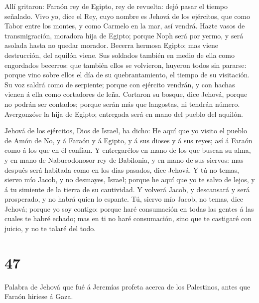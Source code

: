  Allí gritaron: Faraón rey de Egipto, rey de revuelta: dejó
pasar el tiempo señalado.  Vivo yo, dice el Rey, cuyo
nombre es Jehová de los ejércitos, que como Tabor entre los montes, y
como Carmelo en la mar, así vendrá.  Hazte vasos de
transmigración, moradora hija de Egipto; porque Noph será por yermo, y
será asolada hasta no quedar morador.  Becerra hermosa
Egipto; mas viene destrucción, del aquilón viene.  Sus
soldados también en medio de ella como engordados becerros: que también
ellos se volvieron, huyeron todos sin pararse: porque vino sobre ellos
el día de su quebrantamiento, el tiempo de su visitación. 
Su voz saldrá como de serpiente; porque con ejército vendrán, y con
hachas vienen á ella como cortadores de leña.  Cortaron su
bosque, dice Jehová, porque no podrán ser contados; porque serán más que
langostas, ni tendrán número.  Avergonzóse la hija de
Egipto; entregada será en mano del pueblo del aquilón.

 Jehová de los ejércitos, Dios de Israel, ha dicho: He aquí
que yo visito el pueblo de Amón de No, y á Faraón y á Egipto, y á sus
dioses y á sus reyes; así á Faraón como á los que en él confían.
 Y entregarélos en mano de los que buscan su alma, y en
mano de Nabucodonosor rey de Babilonia, y en mano de sus siervos: mas
después será habitada como en los días pasados, dice Jehová.
 Y tú no temas, siervo mío Jacob, y no desmayes, Israel;
porque he aquí que yo te salvo de lejos, y á tu simiente de la tierra de
su cautividad. Y volverá Jacob, y descansará y será prosperado, y no
habrá quien lo espante.  Tú, siervo mío Jacob, no temas,
dice Jehová; porque yo soy contigo: porque haré consumación en todas las
gentes á las cuales te habré echado; mas en ti no haré consumación, sino
que te castigaré con juicio, y no te talaré del todo.

\hypertarget{section-46}{%
\section{47}\label{section-46}}

 Palabra de Jehová que fué á Jeremías profeta acerca de los
Palestinos, antes que Faraón hiriese á Gaza.


